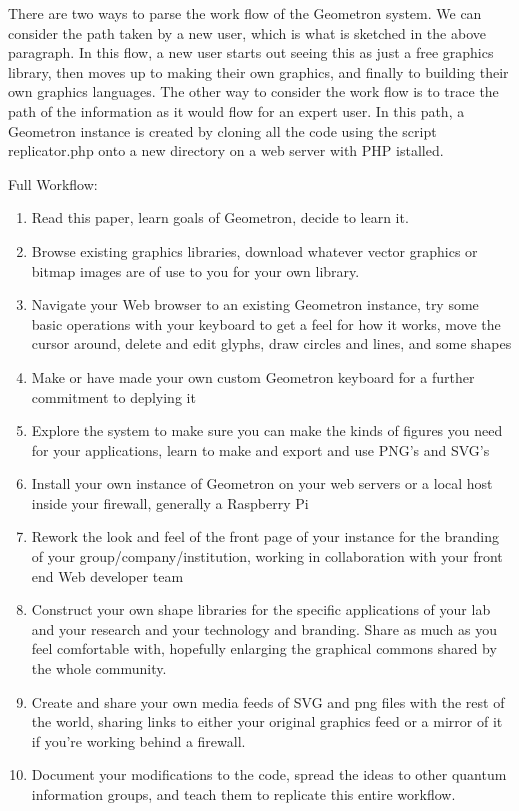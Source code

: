 \documentclass[11pt]{article}
\begin{document}
There are two ways to parse the work flow of the Geometron system.  We can consider the path taken by a new user, which is what is sketched in the above paragraph.  In this flow, a new user starts out seeing this as just a free graphics library, then moves up to making their own graphics, and finally to building their own graphics languages.  The other way to consider the work flow is to trace the path of the information as it would flow for an expert user.  In this path, a Geometron instance is created by cloning all the code using the script replicator.php onto a new directory on a web server with PHP istalled.  

Full Workflow:
\begin{enumerate}

\item Read this paper, learn goals of Geometron, decide to learn it.
\item Browse existing graphics libraries, download whatever vector graphics or bitmap images are of use to you for your own library.
\item Navigate your Web browser to an existing Geometron instance, try some basic operations with your keyboard to get a feel for how it works, move the cursor around, delete and edit glyphs, draw circles and lines, and some shapes
\item Make or have made your own custom Geometron keyboard for a further commitment to deplying it
\item Explore the system to make sure you can make the kinds of figures you need for your applications, learn to make and export and use PNG's and SVG's
\item Install your own instance of Geometron on your web servers or a local host inside your firewall, generally a Raspberry Pi
\item Rework the look and feel of the front page of your instance for the branding of your group/company/institution, working in collaboration with your front end Web developer team 
\item Construct your own shape libraries for the specific applications of your lab and your research and your technology and branding.  Share as much as you feel comfortable with, hopefully enlarging the graphical commons shared by the whole community.  
\item Create and share your own media feeds of SVG and png files with the rest of the world, sharing links to either your original graphics feed or a mirror of it if you're working behind a firewall.
\item Document your modifications to the code, spread the ideas to other quantum information groups, and teach them to replicate this entire workflow.


\end{enumerate}
\end{document}
